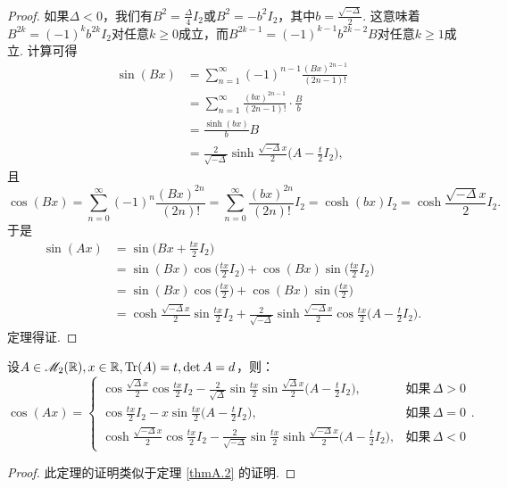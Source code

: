 \begin{proof}
  如果$\varDelta<0$，我们有$B^2=\frac{\varDelta}4I_2$或$B^2=-b^2I_2$，其中$b=\frac{\sqrt{-\varDelta}}2$. 这意味着$B^{2k}=(-1)^kb^{2k}I_2$对任意$k\ge0$成立，而$B^{2k-1}=(-1)^{k-1}b^{2k-2}B$对任意$k\ge1$成立. 计算可得
  \begin{align*}
    \sin(Bx) & = \sum_{n=1}^\infty(-1)^{n-1} \frac{(Bx)^{2n-1}}{(2n-1)!} \\
    & = \sum_{n=1}^\infty \frac{(bx)^{2n-1}}{(2n-1)!} \cdot \frac Bb \\
    & = \frac{\sinh(bx)}b B \\
    & = \frac2{\sqrt{-\varDelta}} \sinh \frac{\sqrt{-\varDelta}x}2 \Big( A - \frac t2I_2 \Big),
  \end{align*}
  且
  \[
    \cos(Bx) = \sum_{n=0}^\infty (-1)^n \frac{(Bx)^{2n}}{(2n)!} = \sum_{n=0}^\infty \frac{(bx)^{2n}}{(2n)!}I_2 = \cosh(bx)I_2 = \cosh \frac{\sqrt{-\varDelta}x}2I_2.
  \]
  于是
  \begin{align*}
    \sin(Ax) & = \sin \Big( Bx + \frac{tx}2 I_2 \Big) \\
    & = \sin(Bx) \cos \Big( \frac{tx}2I_2\Big) + \cos(Bx) \sin \Big( \frac{tx}2I_2\Big) \\
    & = \sin (Bx) \cos \Big( \frac{tx}2\Big) + \cos(Bx) \sin \Big( \frac{tx}2\Big) \\
    & = \cosh \frac{\sqrt{-\varDelta } x}2\sin\frac{tx}2I_2 + \frac2{\sqrt{-\varDelta}}\sinh \frac{\sqrt{-\varDelta} x}2\cos \frac{tx}2 \Big( A - \frac t2I_2 \Big).
  \end{align*}
  定理得证.
\end{proof}

\begin{mybox}
  \begin{theorem}

   设$A\in\mathscr M_2(\mathbb R),x\in\mathbb R,\operatorname{Tr}(A)=t,\det A=d$，则：
   \[
     \cos(Ax) = \begin{cases}
       \cos \frac{\sqrt\varDelta x}2 \cos \frac{tx}2I_2 - \frac2{\sqrt\varDelta} \sin \frac{tx}2 \sin \frac{\sqrt\varDelta x}2\Big( A - \frac t2I_2 \Big), & \text{如果}\, \varDelta > 0 \\
       \cos \frac{tx}2I_2 - x\sin \frac{tx}2 \Big( A - \frac t2I_2 \Big), & \text{如果}\, \varDelta = 0 \\
       \cosh \frac{\sqrt{-\varDelta} x}2 \cos \frac{tx}2I_2 - \frac2{\sqrt{-\varDelta}} \sin \frac{tx}2 \sinh \frac{\sqrt{-\varDelta} x}2\Big( A - \frac t2I_2 \Big), & \text{如果}\, \varDelta < 0
     \end{cases}.
   \]
  \end{theorem}
\end{mybox}
\begin{proof}
  此定理的证明类似于定理 \ref{thmA.2} 的证明.
\end{proof}

